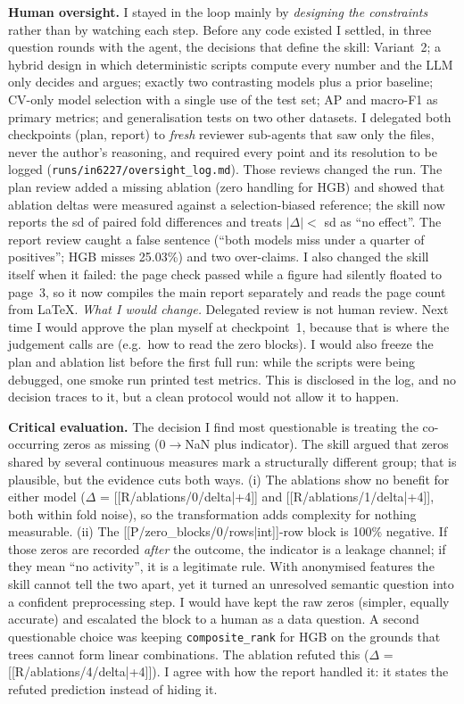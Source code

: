 \textbf{Human oversight.} I stayed in the loop mainly by \emph{designing the constraints} rather than by watching each step. Before any code existed I settled, in three question rounds with the agent, the decisions that define the skill: Variant~2; a hybrid design in which deterministic scripts compute every number and the LLM only decides and argues; exactly two contrasting models plus a prior baseline; CV-only model selection with a single use of the test set; AP and macro-F1 as primary metrics; and generalisation tests on two other datasets. I delegated both checkpoints (plan, report) to \emph{fresh} reviewer sub-agents that saw only the files, never the author's reasoning, and required every point and its resolution to be logged (\texttt{runs/in6227/oversight\_log.md}). Those reviews changed the run. The plan review added a missing ablation (zero handling for HGB) and showed that ablation deltas were measured against a selection-biased reference; the skill now reports the sd of paired fold differences and treats $|\Delta|<$ sd as ``no effect''. The report review caught a false sentence (``both models miss under a quarter of positives''; HGB misses 25.03\%) and two over-claims. I also changed the skill itself when it failed: the page check passed while a figure had silently floated to page~3, so it now compiles the main report separately and reads the page count from LaTeX.
\emph{What I would change.} Delegated review is not human review. Next time I would approve the plan myself at checkpoint~1, because that is where the judgement calls are (e.g.\ how to read the zero blocks). I would also freeze the plan and ablation list before the first full run: while the scripts were being debugged, one smoke run printed test metrics. This is disclosed in the log, and no decision traces to it, but a clean protocol would not allow it to happen.

\textbf{Critical evaluation.} The decision I find most questionable is treating the co-occurring zeros as missing (0$\to$NaN plus indicator). The skill argued that zeros shared by several continuous measures mark a structurally different group; that is plausible, but the evidence cuts both ways. (i) The ablations show no benefit for either model ($\Delta$ = [[R/ablations/0/delta|+4]] and [[R/ablations/1/delta|+4]], both within fold noise), so the transformation adds complexity for nothing measurable. (ii) The [[P/zero_blocks/0/rows|int]]-row block is 100\% negative. If those zeros are recorded \emph{after} the outcome, the indicator is a leakage channel; if they mean ``no activity'', it is a legitimate rule. With anonymised features the skill cannot tell the two apart, yet it turned an unresolved semantic question into a confident preprocessing step. I would have kept the raw zeros (simpler, equally accurate) and escalated the block to a human as a data question. A second questionable choice was keeping \texttt{composite\_rank} for HGB on the grounds that trees cannot form linear combinations. The ablation refuted this ($\Delta$ = [[R/ablations/4/delta|+4]]). I agree with how the report handled it: it states the refuted prediction instead of hiding it.

